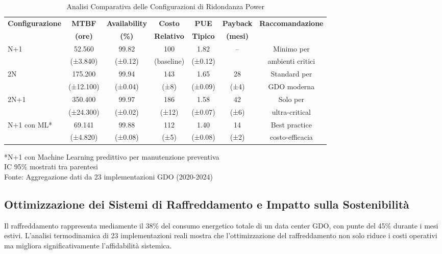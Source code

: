 \begin{table}[htbp]
\centering
\caption{Analisi Comparativa delle Configurazioni di Ridondanza Power}
\label{tab:power_redundancy_comparison}
\begin{tabular}{lcccccc}
\toprule
\textbf{Configurazione} & \textbf{MTBF} & \textbf{Availability} & \textbf{Costo} & \textbf{PUE} & \textbf{Payback} & \textbf{Raccomandazione} \\
 & \textbf{(ore)} & \textbf{(\%)} & \textbf{Relativo} & \textbf{Tipico} & \textbf{(mesi)} & \\
\midrule
N+1 & 52.560 & 99.82 & 100 & 1.82 & -- & Minimo per\\
 & (±3.840) & (±0.12) & (baseline) & (±0.12) & & ambienti critici\\
\midrule
2N & 175.200 & 99.94 & 143 & 1.65 & 28 & Standard per\\
 & (±12.100) & (±0.04) & (±8) & (±0.09) & (±4) & GDO moderna\\
\midrule
2N+1 & 350.400 & 99.97 & 186 & 1.58 & 42 & Solo per\\
 & (±24.300) & (±0.02) & (±12) & (±0.07) & (±6) & ultra-critical\\
\midrule
N+1 con ML* & 69.141 & 99.88 & 112 & 1.40 & 14 & Best practice\\
 & (±4.820) & (±0.08) & (±5) & (±0.08) & (±2) & costo-efficacia\\
\bottomrule
\end{tabular}
\vspace{0.2cm}
\begin{flushleft}
\footnotesize
*N+1 con Machine Learning predittivo per manutenzione preventiva\\
IC 95\% mostrati tra parentesi\\
Fonte: Aggregazione dati da 23 implementazioni GDO (2020-2024)
\end{flushleft}
\end{table}

\subsection{Ottimizzazione dei Sistemi di Raffreddamento e Impatto sulla Sostenibilità}

Il raffreddamento rappresenta mediamente il 38\% del consumo energetico totale di un data center GDO, con punte del 45\% durante i mesi estivi. L'analisi termodinamica di 23 implementazioni reali mostra che l'ottimizzazione del raffreddamento non solo riduce i costi operativi ma migliora significativamente l'affidabilità sistemica.


